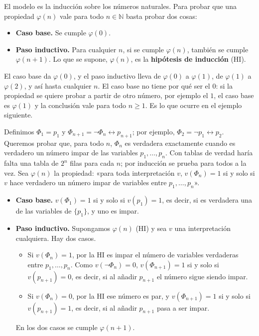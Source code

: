 El modelo es la inducción sobre los números naturales. Para probar que una propiedad $\varphi(n)$ vale para todo $n \in \mathbb{N}$ basta probar dos cosas:
\begin{itemize}
    \item \textbf{Caso base.} Se cumple $\varphi(0)$.
    \item \textbf{Paso inductivo.} Para cualquier $n$, si se cumple $\varphi(n)$, también se cumple $\varphi(n+1)$. Lo que se supone, $\varphi(n)$, es la \textbf{hipótesis de inducción} (HI).
\end{itemize}
El caso base da $\varphi(0)$, y el paso inductivo lleva de $\varphi(0)$ a $\varphi(1)$, de $\varphi(1)$ a $\varphi(2)$, y así hasta cualquier $n$. El caso base no tiene por qué ser el $0$: si la propiedad se quiere probar a partir de otro número, por ejemplo el $1$, el caso base es $\varphi(1)$ y la conclusión vale para todo $n \geq 1$. Es lo que ocurre en el ejemplo siguiente.

\begin{ejemplo}
Definimos $\Phi_1 = p_1$ y $\Phi_{n+1} = \neg\Phi_n \leftrightarrow p_{n+1}$; por ejemplo, $\Phi_2 = \neg p_1 \leftrightarrow p_2$. Queremos probar que, para todo $n$, $\Phi_n$ es verdadera exactamente cuando es verdadero un número impar de las variables $p_1, \dots, p_n$. Con tablas de verdad haría falta una tabla de $2^n$ filas para cada $n$; por inducción se prueba para todos a la vez. Sea $\varphi(n)$ la propiedad: «para toda interpretación $v$, $v(\Phi_n) = 1$ si y solo si $v$ hace verdadero un número impar de variables entre $p_1, \dots, p_n$».
\begin{itemize}
    \item \textbf{Caso base.} $v(\Phi_1) = 1$ si y solo si $v(p_1) = 1$, es decir, si es verdadera una de las variables de $\{p_1\}$, y uno es impar.
    \item \textbf{Paso inductivo.} Supongamos $\varphi(n)$ (HI) y sea $v$ una interpretación cualquiera. Hay dos casos.
    \begin{itemize}
        \item Si $v(\Phi_n) = 1$, por la HI es impar el número de variables verdaderas entre $p_1, \dots, p_n$. Como $v(\neg\Phi_n) = 0$, $v(\Phi_{n+1}) = 1$ si y solo si $v(p_{n+1}) = 0$, es decir, si al añadir $p_{n+1}$ el número sigue siendo impar.
        \item Si $v(\Phi_n) = 0$, por la HI ese número es par, y $v(\Phi_{n+1}) = 1$ si y solo si $v(p_{n+1}) = 1$, es decir, si al añadir $p_{n+1}$ pasa a ser impar.
    \end{itemize}
    En los dos casos se cumple $\varphi(n+1)$.
\end{itemize}
\end{ejemplo}

